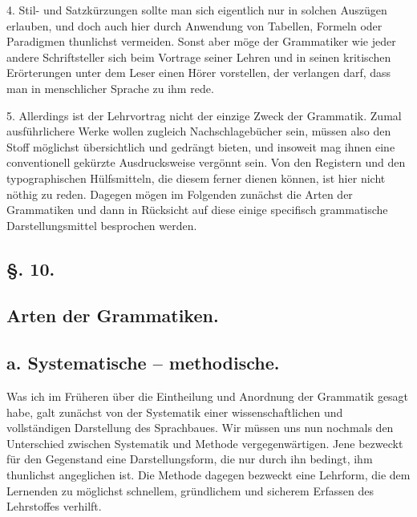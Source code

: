 4. Stil- und Satzkürzungen sollte man sich eigentlich nur in solchen Auszügen erlauben, und doch auch hier durch Anwendung von Tabellen, Formeln oder Paradigmen thunlichst vermeiden. Sonst aber möge der Grammatiker wie jeder andere Schriftsteller sich beim Vortrage seiner Lehren und in seinen kritischen Erörterungen unter dem Leser einen Hörer vorstellen, der verlangen darf, dass man in menschlicher Sprache zu ihm rede.

5. Allerdings ist der Lehrvortrag nicht der einzige Zweck der Grammatik. Zumal ausführlichere Werke wollen zugleich Nachschlagebücher sein, müssen also den Stoff möglichst übersichtlich und gedrängt bieten, und insoweit mag ihnen eine conventionell gekürzte Ausdrucksweise vergönnt sein. Von den Registern und den typographischen Hülfsmitteln, die diesem  ferner dienen können, ist hier nicht nöthig zu reden. Dagegen mögen im Folgenden zunächst die Arten der Grammatiken und dann in Rücksicht auf diese einige specifisch grammatische Darstellungsmittel besprochen werden.

\begin{styleAnmerk}
\end{styleAnmerk}

\subsection*{§. 10.}\label{II.VI.10}
\subsection*{Arten der Grammatiken.}
\subsection*{a. Systematische – methodische.}

\largerpage
Was ich im Früheren über die Eintheilung und Anordnung der Grammatik gesagt habe, galt zunächst von der Systematik einer wissenschaftlichen und vollständigen Darstellung des Sprachbaues. Wir müssen uns nun nochmals den Unterschied zwischen Systematik und Methode vergegenwärtigen. Jene bezweckt für den Gegenstand eine Darstellungsform, die nur durch ihn bedingt, ihm thunlichst angeglichen ist. Die Methode dagegen bezweckt eine Lehrform, die dem Lernenden zu möglichst schnellem, gründlichem und sicherem Erfassen des Lehrstoffes verhilft.

